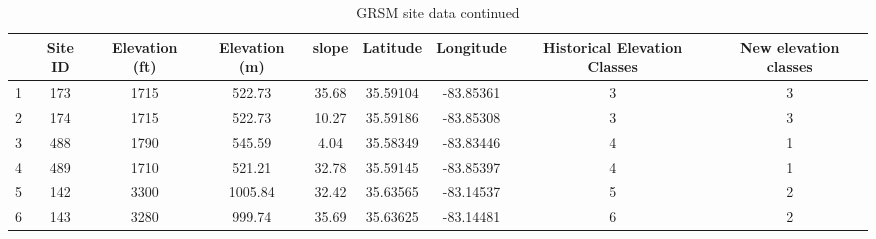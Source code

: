 \begin{table}[p]\scriptsize
\centering
\caption{GRSM site data continued}
\begin{tabular}{ccccccccc}
\toprule
    & \multicolumn{ 1}{p{1cm}}{Site ID} & \multicolumn{ 1}{p{1.4cm}}{Elevation (ft)} & \multicolumn{ 1}{p{1.4cm}}{Elevation (m)} & slope & Latitude   & Longitude  & \multicolumn{ 1}{p{2cm}}{Historical Elevation Classes} & \multicolumn{ 1}{p{1.4cm}}{New elevation classes} \\  
\midrule
1   & 173                                                 & 1715                                                          & 522.73                                                       & 35.68 & 35.59104 & -83.85361 & 3                                                                                      & 3 \\ 
2   & 174                                                 & 1715                                                          & 522.73                                                       & 10.27 & 35.59186 & -83.85308 & 3                                                                                      & 3 \\ 
3   & 488                                                 & 1790                                                          & 545.59                                                       & 4.04   & 35.58349 & -83.83446 & 4                                                                                      & 1 \\ 
4   & 489                                                 & 1710                                                          & 521.21                                                       & 32.78 & 35.59145 & -83.85397 & 4                                                                                      & 1 \\ 
5   & 142                                                 & 3300                                                          & 1005.84                                                     & 32.42 & 35.63565 & -83.14537 & 5                                                                                      & 2 \\ 
6   & 143                                                 & 3280                                                          & 999.74                                                       & 35.69 & 35.63625 & -83.14481 & 6                                                                                      & 2 \\ 

\end{tabular}
\end{table}
